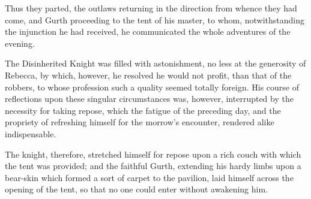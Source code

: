 Thus they parted, the outlaws returning in the direction from whence
they had come, and Gurth proceeding to the tent of his master, to whom,
notwithstanding the injunction he had received, he communicated the
whole adventures of the evening.

The Disinherited Knight was filled with astonishment, no less at the
generosity of Rebecca, by which, however, he resolved he would not
profit, than that of the robbers, to whose profession such a quality
seemed totally foreign. His course of reflections upon these singular
circumstances was, however, interrupted by the necessity for taking
repose, which the fatigue of the preceding day, and the propriety of
refreshing himself for the morrow's encounter, rendered alike
indispensable.

The knight, therefore, stretched himself for repose upon a rich couch
with which the tent was provided; and the faithful Gurth, extending his
hardy limbs upon a bear-skin which formed a sort of carpet to the
pavilion, laid himself across the opening of the tent, so that no one
could enter without awakening him.
